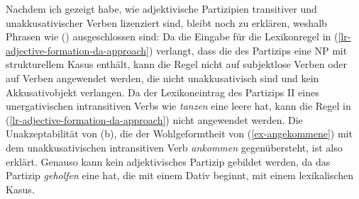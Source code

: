 {Nachdem ich gezeigt habe, wie adjektivische Partizipien transitiver
und unakkusativischer Verben lizenziert sind, bleibt noch zu erklären,
weshalb Phrasen wie () ausgeschlossen sind:
Da die Eingabe für die Lexikonregel in (\ref{lr-adjective-formation-da-approach})
verlangt, dass die \compsl des Partizips eine NP mit strukturellem Kasus
enthält, kann die Regel nicht auf subjektlose Verben oder auf Verben angewendet
werden, die nicht unakkusativisch sind und kein Akkusativobjekt verlangen.
\eal
{}
\zl
Da der Lexikoneintrag des Partizips II eines unergativischen intransitiven Verbs
wie \emph{tanzen} eine leere \compsl hat, kann die Regel in (\ref{lr-adjective-formation-da-approach}) nicht angewendet
werden. Die Unakzeptabilität von (b), die der Wohlgeformtheit von (\ref{ex-angekommene}) mit dem unakkusativischen
intransitiven Verb \emph{ankommen} gegenübersteht, ist also erklärt.
Genauso kann kein adjektivisches Partizip  gebildet werden, da das Partizip \emph{geholfen}
eine \compsl hat, die mit einem Dativ beginnt, \dash mit einem lexikalischen Kasus.



}
